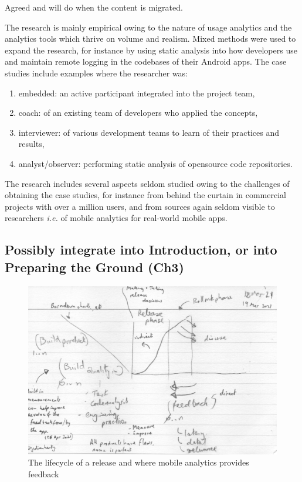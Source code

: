  Agreed and will do when the content is migrated.

The research is mainly empirical owing to the nature of usage analytics and the analytics tools which thrive on volume and realism. Mixed methods were used to expand the research, for instance by using static analysis into how developers use and maintain remote logging in the codebases of their Android apps. The case studies include examples where the researcher was:
\begin{enumerate}
    \item embedded: an active participant integrated into the project team,
    \item coach: of an existing team of developers who applied the concepts,
    \item interviewer: of various development teams to learn of their practices and results,
    \item analyst/observer: performing static analysis of opensource code repositories.
\end{enumerate}

The research includes several aspects seldom studied owing to the challenges of obtaining the case studies, for instance from behind the curtain in commercial projects with over a million users, and from sources again seldom visible to researchers \emph{i.e.} of mobile analytics for real-world mobile apps.

\clearpage

\subsection{Possibly integrate into Introduction, or into Preparing the Ground (Ch3)}
\begin{figure}
    \centering
    \includegraphics[width=15cm]{images/rough-sketches/Red-Thread-Rough-Sketch.jpeg}
    \caption{The lifecycle of a release and where mobile analytics provides feedback}
    \label{fig:red-thread-for-this-thesis}
\end{figure}

